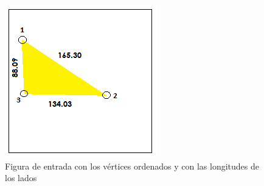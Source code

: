 		\begin{figure}[htbp]
		\centering
		\hspace*{0.0in}
		\includegraphics[scale=1.0]{graphics/simpletest1-F1.png}
		\caption{Figura de entrada con los vértices ordenados y con las longitudes de los lados}
		\label{fig:Figura1Voz1}
		\end{figure}

